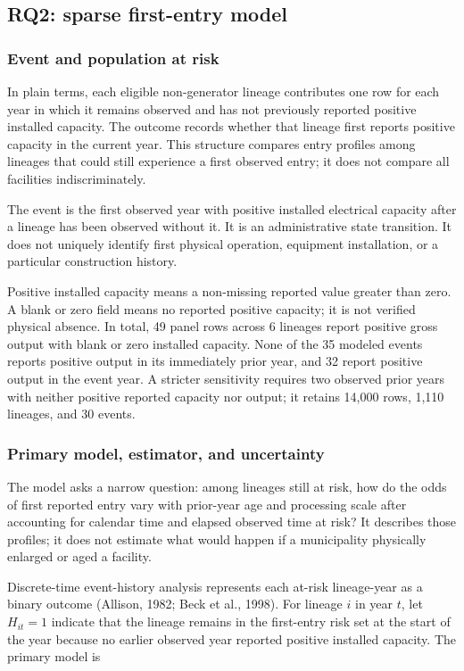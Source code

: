 \documentclass[12pt,letterpaper]{article}
\begin{document}
\subsection{RQ2: sparse first-entry model}

\subsubsection{Event and population at risk}

In plain terms, each eligible non-generator lineage contributes one row for
each year in which it remains observed and has not previously reported positive
installed capacity. The outcome records whether that lineage first reports
positive capacity in the current year. This structure compares entry profiles
among lineages that could still experience a first observed entry; it does not
compare all facilities indiscriminately.

The event is the first observed year with positive installed electrical capacity
after a lineage has been observed without it. It is an administrative state
transition. It does not uniquely identify first physical operation, equipment
installation, or a particular construction history.

Positive installed capacity means a non-missing reported value greater than
zero. A blank or zero field means no reported positive capacity; it is not
verified physical absence. In total, 49 panel rows across 6 lineages report
positive gross output with blank or zero installed capacity. None of the 35
modeled events reports positive output in its immediately prior year, and 32
report positive output in the event year. A stricter sensitivity requires two
observed prior years with neither positive reported capacity nor output; it
retains 14,000 rows, 1,110 lineages, and 30 events.

\subsubsection{Primary model, estimator, and uncertainty}

The model asks a narrow question: among lineages still at risk, how do the odds
of first reported entry vary with prior-year age and processing scale after
accounting for calendar time and elapsed observed time at risk? It describes
those profiles; it does not estimate what would happen if a municipality
physically enlarged or aged a facility.

Discrete-time event-history analysis represents each at-risk lineage-year as a
binary outcome (Allison, 1982; Beck et al., 1998). For lineage $i$ in year
$t$, let $H_{it}=1$ indicate that the lineage remains in the first-entry risk
set at the start of the year because no earlier observed year reported positive
installed capacity. The primary model is
\end{document}
